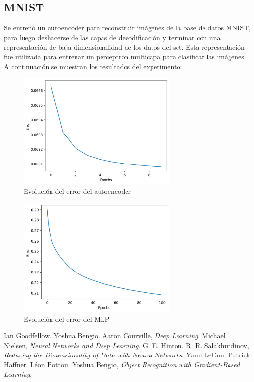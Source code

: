 \documentclass[12pt,a4paper]{article}
\begin{document}
\subsection{MNIST}
Se entrenó un autoencoder para reconstruir imágenes de la base de datos MNIST, para luego deshacerse de las capas de decodificación y terminar con una representación de baja dimensionalidad de los datos del set. Esta representación fue utilizada para entrenar un perceptrón multicapa para clasificar las imágenes. A continuación se muestran los resultados del experimento:
\begin{figure}[H]
    \includegraphics[width=0.7\textwidth]{img/22-training_error.png}
    \centering
    \caption*{Evolución del error del autoencoder}
\end{figure}
\begin{figure}[H]
    \includegraphics[width=0.7\textwidth]{img/23-training_error.png}
    \centering
    \caption*{Evolución del error del MLP}
\end{figure}

\newpage
\begin{thebibliography}{9}
 Ian Goodfellow. Yoshua Bengio. Aaron Courville, \emph{Deep Learning}.
 Michael Nielsen, \emph{Neural Networks and Deep Learning}.
 G. E. Hinton. R. R. Salakhutdinov, \emph{Reducing the Dimensionality of Data with Neural Networks}.
 Yann LeCun. Patrick Haffner. Léon Bottou. Yoshua Bengio, \emph{Object Recognition with Gradient-Based Learning}.

\end{thebibliography}
\end{document}
